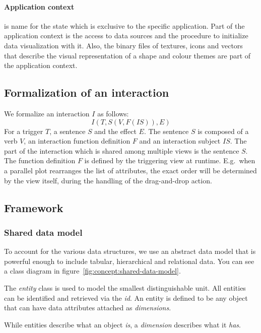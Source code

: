 \documentclass{article}
\begin{document}
\paragraph{Application context} is name for the state which is exclusive to the specific application.
Part of the application context is the access to data sources and the procedure to initialize data visualization with it.
Also, the binary files of textures, icons and vectors that describe the visual representation of a shape and colour themes are part of the application context.

\subsection{Formalization of an interaction}

We formalize an interaction $I$ as follows:
\begin{equation}
  I(T, S(V, F(IS)), E)
\end{equation}
For a trigger $T$, a sentence $S$ and the effect $E$.
The sentence $S$ is composed of a verb $V$, an interaction function definition $F$ and an interaction subject $IS$.
The part of the interaction which is shared among multiple views is the sentence $S$.
The function definition $F$ is defined by the triggering view at runtime.
E.g.\ when a parallel plot rearranges the list of attributes, the exact order will be determined by the view itself, during the handling of the drag-and-drop action.

\subsection{Framework}

\subsubsection{Shared data model}\label{sec:concept:data-model}
To account for the various data structures, we use an abstract data model that is powerful enough to include tabular, hierarchical and relational data.
You can see a class diagram in figure~\ref{fig:concept:shared-data-model}.

The \emph{entity} class is used to model the smallest distinguishable unit.
All entities can be identified and retrieved via the \emph{id}.
An entity is defined to be any object that can have data attributes attached as \emph{dimensions}.

While entities describe what an object \emph{is}, a \emph{dimension} describes what it \emph{has}.
\end{document}

